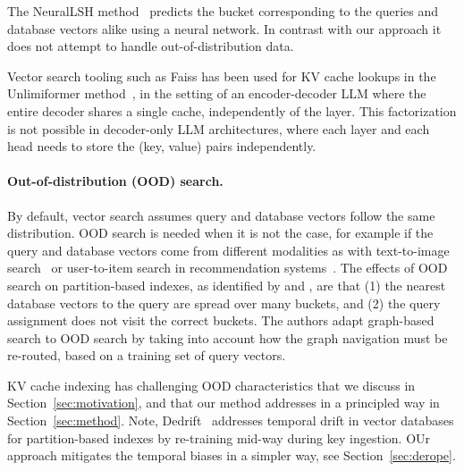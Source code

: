 The NeuralLSH method~\cite{dong2019learning} predicts the bucket corresponding to the queries and database vectors alike using a neural network. 
%
In contrast with our approach it does not attempt to handle out-of-distribution data. 

Vector search tooling such as Faiss has been used for KV cache lookups in the Unlimiformer method~\citep{bertsch2024unlimiformer}, in the setting of an encoder-decoder LLM where the entire decoder shares a single cache, independently of the layer. 
This factorization is not possible in decoder-only LLM architectures, where each layer and each head needs to store the (key, value) pairs independently.
%



%

%


%


\paragraph{Out-of-distribution (OOD) search.}

By default, vector search assumes query and database vectors follow the same distribution. 
OOD search is needed when it is not the case, for example if the query and database vectors come from different modalities as with text-to-image search~\citep{simhadri2024results} or user-to-item search in recommendation systems~\citep{paterek2007improving}.
%
The effects of OOD search on partition-based indexes, as identified by \citet{jaiswal2022ood} and \citet{chen2024roargraph}, are that 
(1) the nearest database vectors to the query are spread over many buckets, and 
(2) the query assignment does not visit the correct buckets.
The authors adapt graph-based search to OOD search by taking into account how the graph navigation must be re-routed, based on a training set of query vectors. 

%

%
%
%

KV cache indexing has challenging OOD characteristics that we discuss in Section~\ref{sec:motivation}, and that our method \OURS addresses in a principled way in  Section~\ref{sec:method}. 
%
Note, Dedrift~\citep{baranchuk2023dedrift} addresses temporal drift in vector databases for partition-based indexes by re-training mid-way during key ingestion. 
OUr \OURS approach mitigates the temporal biases in a simpler way, see  Section~\ref{sec:derope}.
%

%
%

%
%



%
%
